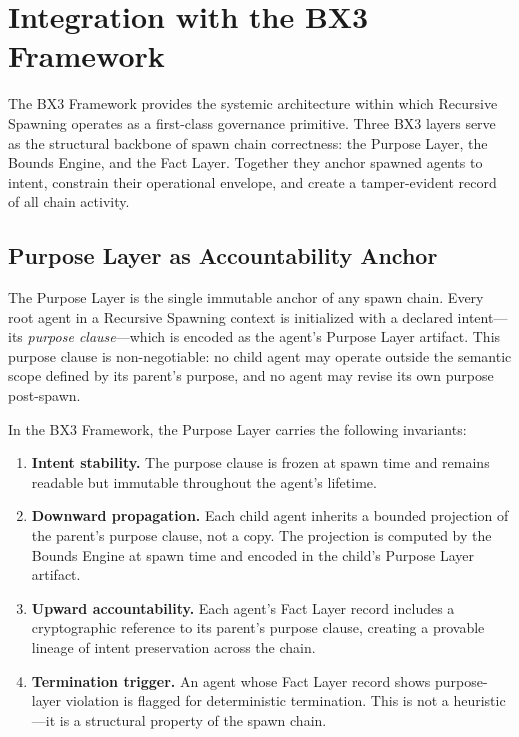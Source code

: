 \section{Integration with the BX3 Framework}

The BX3 Framework provides the systemic architecture within which Recursive Spawning operates as a first-class governance primitive. Three BX3 layers serve as the structural backbone of spawn chain correctness: the Purpose Layer, the Bounds Engine, and the Fact Layer. Together they anchor spawned agents to intent, constrain their operational envelope, and create a tamper-evident record of all chain activity.

\subsection{Purpose Layer as Accountability Anchor}

The Purpose Layer is the single immutable anchor of any spawn chain. Every root agent in a Recursive Spawning context is initialized with a declared intent—its \textit{purpose clause}—which is encoded as the agent's Purpose Layer artifact. This purpose clause is non-negotiable: no child agent may operate outside the semantic scope defined by its parent's purpose, and no agent may revise its own purpose post-spawn.

In the BX3 Framework, the Purpose Layer carries the following invariants:

\begin{enumerate}
    \item \textbf{Intent stability.} The purpose clause is frozen at spawn time and remains readable but immutable throughout the agent's lifetime.
    \item \textbf{Downward propagation.} Each child agent inherits a bounded projection of the parent's purpose clause, not a copy. The projection is computed by the Bounds Engine at spawn time and encoded in the child's Purpose Layer artifact.
    \item \textbf{Upward accountability.} Each agent's Fact Layer record includes a cryptographic reference to its parent's purpose clause, creating a provable lineage of intent preservation across the chain.
    \item \textbf{Termination trigger.} An agent whose Fact Layer record shows purpose-layer violation is flagged for deterministic termination. This is not a heuristic—it is a structural property of the spawn chain.
\end{enumerate}

